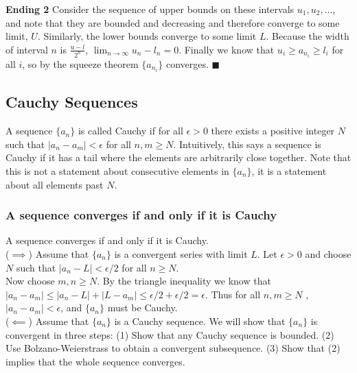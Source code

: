     \textbf{Ending 2} Consider the sequence of upper bounds on these intervals $u_1, u_2, ... $,
    and note that they are bounded and decreasing and therefore converge to some limit, $U$. 
    Similarly, the lower bounds converge to some limit $L$. Because the width of interval $n$ is
    $\frac{u-l}{2^n}$, $\lim_{n \to \infty} u_n - l_n = 0$. Finally we know that $u_i \geq 
    a_{n_i} \geq l_i$ for all $i$, so by the squeeze theorem $\{a_{n_i}\}$ converges. 
    $\blacksquare$\\
    

  \subsection{Cauchy Sequences}
    A sequence $\{a_n\}$ is called Cauchy if for all $\epsilon > 0$ there exists a positive 
    integer $N$ such that $|a_n - a_m| < \epsilon$ for all $n, m \geq N$. Intuitively, this
    says a sequence is Cauchy if it has a tail where the elements are arbitrarily close 
    together. Note that this is not a statement about consecutive elements in $\{a_n\}$, it is
    a statement about all elements past $N$.
  \subsubsection{A sequence converges if and only if it is Cauchy}
    \thm A sequence converges if and only if it is Cauchy.\\

    \pf ($\implies$) Assume that $\{a_n\}$ is a convergent series with limit $L$. Let 
    $\epsilon > 0$ and choose $N$ such that $|a_n - L| < \epsilon/2$ for all $n \geq N$.\\

    Now choose $m,n \geq N$. By the triangle inequality we know that $|a_n - a_m| \leq
    |a_n - L| + |L - a_m| \leq \epsilon/2 + \epsilon/2 = \epsilon$. Thus for all $n, m\geq N$
    , $|a_n - a_m| < \epsilon$, and $\{a_n\}$ must be Cauchy.\\

    ($\impliedby$) Assume that $\{a_n\}$ is a Cauchy sequence. We will show that $\{a_n\}$ is
    convergent in three steps: (1) Show that any Cauchy sequence is bounded. (2) Use 
    Bolzano-Weierstrass to obtain a convergent subsequence. (3) Show that (2) implies that 
    the whole sequence converges.\\

